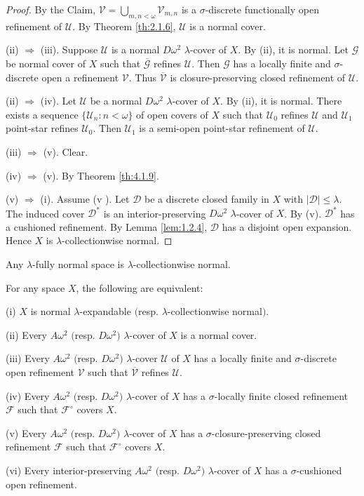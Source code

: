\documentclass[main.tex]{subfiles}
\begin{document}
\begin{proof}
 By the Claim, $\mathscr{V} = \bigcup_{m,n<\omega}\mathscr{V}_{m,n}$ is a 
 $\sigma$-discrete functionally open refinement of $\mathscr{U}$.
 By Theorem \ref{th:2.1.6},  %
  $\mathscr{U}$ is a normal cover.
 
 (ii) $\Rightarrow$ (iii). 
 Suppose $\mathscr{U}$ is a normal $D\omega^2$ $\lambda$-cover of $X$. 
 By (ii), it is normal.
 Let $\mathscr{G}$ be  normal cover of $X$ such that $\mathscr{\overline{G}}$
refines $\mathscr{U}$.
 Then $\mathscr{G}$ has a locally finite and $\sigma$-discrete open a refinement
 $\mathscr{V}$. Thus $\mathscr{\overline{V}}$ is closure-preserving closed refinement of $\mathscr{U}$.
 
(ii) $\Rightarrow$ (iv). Let $\mathscr{U}$ be a normal $D\omega^2$ $\lambda$-cover 
of $X$.  By (ii), it is normal.
There exists a sequence $\{\mathscr{U}_n: n < \omega\}$ of open covers of $X$
such that $\mathscr{U}_0$ refines $\mathscr{U}$ and $\mathscr{U}_1$
point-star refines $\mathscr{U}_0$. Then $\mathscr{U}_1$ is a semi-open 
point-star refinement of $\mathscr{U}$.
 
(iii) $\Rightarrow$ (v). Clear. 
 
(iv) $\Rightarrow$ (v). 
 By Theorem \ref{th:4.1.9}. 
 
 (v) $\Rightarrow$ (i). 
 Assume (v ). 
 Let $\mathscr{D}$ be a discrete closed family in $X$ with $|\mathscr{D}| \le \lambda$. 
 The induced cover $\mathscr{D}^*$ is an interior-preserving $D\omega^2$ 
 $\lambda$-cover of $X$. 
 By (v). $\mathscr{D}^*$ has a cushioned refinement. 
 By Lemma \ref{lem:1.2.4}, $\mathscr{D}$ has a disjoint open expansion. 
 Hence $X$ is $\lambda$-collectionwise normal. 
 \end{proof}

 
 {\corollary{} \label{cor:8.1.6}
 Any $\lambda$-fully normal space is $\lambda$-collectionwise normal. \hfill\qedsymbol
 }
 
 
 {\theorem{} \label{th:8.1.7}
For any space $X$, the following are equivalent: 

\textup{(i)}  $X$ is normal $\lambda$-expandable $($resp. $\lambda$-collectionwise 
normal$)$. 

\textup{(ii)}  Every $A\omega^2$ $($resp. $D\omega^2)$  $\lambda$-cover of $X$ 
is a normal cover. 

\textup{(iii)}   Every $A\omega^2$ $($resp. $D\omega^2)$  $\lambda$-cover 
$\mathscr{U}$  of $X$ has a locally finite and $\sigma$-discrete open 
refinement $\mathscr{V}$ such that $\mathscr{\overline{V}}$ refines $\mathscr{U}$.

\textup{(iv)}  Every $A\omega^2$ $($resp. $D\omega^2)$  $\lambda$-cover 
of $X$ has a $\sigma$-locally finite closed
refinement $\mathscr{F}$ such that $\mathscr{F}^\circ$ covers $X$.

\textup{(v)}  Every $A\omega^2$ $($resp. $D\omega^2)$  $\lambda$-cover 
of $X$ has a $\sigma$-closure-preserving  closed
refinement $\mathscr{F}$ such that $\mathscr{F}^\circ$ covers $X$.

\textup{(vi)}  Every interior-preserving $A\omega^2$ 
$($resp. $D\omega^2)$  $\lambda$-cover 
of $X$ has a $\sigma$-cushioned open refinement.
}
\end{document}
